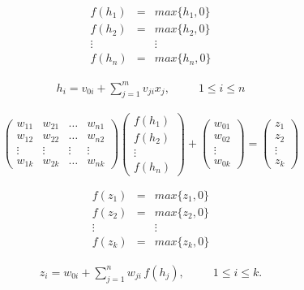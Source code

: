 \documentclass[fleqn, 12pt]{article}
\begin{document}
\[
\begin{array}{ccc}
f(h_1) & = & max\{h_1, 0\} \\
f(h_2) & = & max\{h_2, 0\} \\
\vdots & & \vdots \\
f(h_n) & = & max\{h_n, 0\}
\end{array}
\]

\begin{align}
    h_i = v_{0i} + \sum_{j=1}^m {v_{ji}x_j},
    \hspace{30pt} 1 \leq i \leq n
\end{align}

\[ \left(
\begin{array}{cccc}
w_{11} & w_{21} & \ldots & w_{n1} \\
w_{12} & w_{22} & \ldots & w_{n2} \\
\vdots & \vdots & \vdots & \vdots \\
w_{1k} & w_{2k} & \ldots & w_{nk}
\end{array}
\right)
\left(
\begin{array}{cccc}
f(h_1) \\
f(h_2) \\
\vdots \\
f(h_n)
\end{array}
\right)
+ 
\left(
\begin{array}{cccc}
w_{01} \\
w_{02} \\
\vdots \\
w_{0k}
\end{array}
\right)
=
\left(
\begin{array}{cccc}
z_{1} \\
z_{2} \\
\vdots \\
z_{k}
\end{array}
\right)
\]

\[
\begin{array}{ccc}
f(z_1) & = & max\{z_1, 0\} \\
f(z_2) & = & max\{z_2, 0\} \\
\vdots & & \vdots \\
f(z_k) & = & max\{z_k, 0\}
\end{array}
\]

\begin{align}
    z_i = w_{0i} + \sum_{j=1}^n {w_{ji}\,f(h_j)},
    \hspace{30pt} 1 \leq i \leq k.
\end{align}
\end{document}
